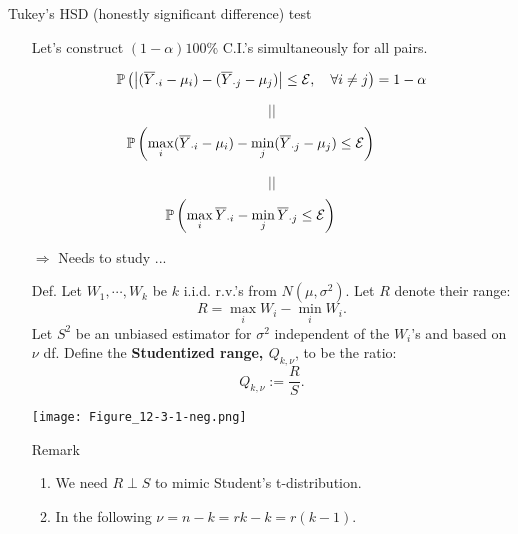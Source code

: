 \begin{frame}[fragile]{Tukey's HSD (honestly significant difference) test}
	\begin{enumerate}
		\item[] Let's construct $(1-\alpha)100\%$ C.I.'s simultaneously for all pairs.
			\vfill
		\item[]
			\[
				\mathbb{P}\left(\left|(\overline{Y}_{\cdot i}-\mu_i) - (\overline{Y}_{\cdot j}-\mu_j)\right|\le \mathcal{E},\quad \forall i\ne j\right) = 1-\alpha
			\]
		\item[]
			\[
				||
			\]
			\[
				\mathbb{P}\left(\max_{i}(\overline{Y}_{\cdot i}-\mu_i) - \min_{j}(\overline{Y}_{\cdot j}-\mu_j)\le \mathcal{E}\right)\hspace{3em}
			\]
		\item[]
			\[
				||
			\]
			\[
				\mathbb{P}\left(\max_{i}\overline{Y}_{\cdot i} - \min_{j}\overline{Y}_{\cdot j}\le \mathcal{E}\right)\hspace{3em}
			\]
			\vfill
		\item[$\Longrightarrow$]  Needs to study  ...
	\end{enumerate}
\end{frame}
\begin{frame}[fragile]

	\begin{enumerate}
		\item[Def.] Let $W_1,\cdots, W_k$ be $k$ i.i.d. r.v.'s from $N(\mu,\sigma^2)$. Let $R$ denote their range:
		\[
		R =\max_i W_ i -\min_i W_i.
		\]
		Let $S^2$ be an unbiased estimator for $\sigma^2$ independent of the $W_i$'s and based on $\nu$ df.
		Define the {\bf Studentized range, $Q_{k,\nu}$}, to be the ratio:
		\[
			Q_{k,\nu} :=\frac RS.
		\]
		\vfill
	\item[]
		\begin{center}
			\texttt{[image: Figure\_12-3-1-neg.png]}
		\end{center}
	\item[Remark]
		\begin{enumerate}
			\item We need $R\perp S$ to mimic Student's t-distribution.
			\item In the following $\nu = n-k = rk -k = r(k-1)$.
		\end{enumerate}
\end{enumerate}
\end{frame}
